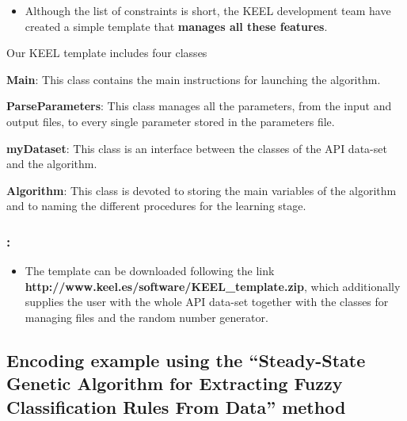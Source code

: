 \documentclass{beamer}
\begin{document}
\begin{CJK*}{UTF8}{bsmi}
\begin{frame}
	
	\begin{itemize}
		\item Although the list of constraints is short, the KEEL development team have created a simple template that \textbf{manages all these features}.
	\end{itemize}
	\begin{block}{Our KEEL template includes four classes}
		\begin{itemize}
{\small 		\item \textbf{Main}: This class contains the main instructions for launching the algorithm. 
			\item \textbf{ParseParameters}: This class manages all the parameters, from the input and output files, to every single parameter stored in the parameters file.
			\item \textbf{myDataset}: This class is an interface between the classes of the API data-set and the algorithm.
			\item \textbf{Algorithm}: This class is devoted to storing the main variables of the algorithm and to naming the different procedures for the learning stage.}
		\end{itemize}
	\end{block}
	
\end{frame}


\begin{frame}
	\frametitle{\insertsection : \insertsubsection}
	
	
	\begin{itemize}
		\item The template can be downloaded following the link \textbf{http://www.keel.es/software/KEEL\_template.zip}, which additionally supplies the user with the whole API data-set together with the classes for managing files and the random number generator.
	\end{itemize}
	
\end{frame}

\subsection{Encoding example using the “Steady-State Genetic Algorithm for Extracting Fuzzy Classification Rules From Data” method}


\end{CJK*}
\end{document}
